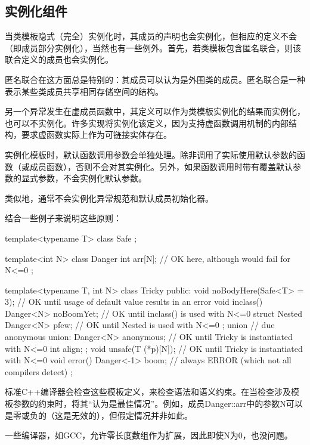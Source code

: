 \subsection{实例化组件}

当类模板隐式（完全）实例化时，其成员的声明也会实例化，但相应的定义不会（即成员部分实例化），当然也有一些例外。首先，若类模板包含匿名联合，则该联合定义的成员也会实例化。

\begin{notice}
匿名联合在这方面总是特别的：其成员可以认为是外围类的成员。匿名联合是一种表示某些类成员共享相同存储空间的结构。
\end{notice}

另一个异常发生在虚成员函数中，其定义可以作为类模板实例化的结果而实例化，也可以不实例化。许多实现将实例化该定义，因为支持虚函数调用机制的内部结构，要求虚函数实际上作为可链接实体存在。 

实例化模板时，默认函数调用参数会单独处理。除非调用了实际使用默认参数的函数（或成员函数），否则不会对其实例化。另外，如果函数调用时带有覆盖默认参数的显式参数，不会实例化默认参数。

类似地，通常不会实例化异常规范和默认成员初始化器。

结合一些例子来说明这些原则：

\begin{cpp}
template<typename T>
class Safe {};

template<int N>
class Danger {
	int arr[N]; // OK here, although would fail for N<=0
};

template<typename T, int N>
class Tricky {
	public:
	void noBodyHere(Safe<T> = 3); // OK until usage of default value results in an error
	void inclass() {
		Danger<N> noBoomYet; // OK until inclass() is used with N<=0
	}
	struct Nested {
		Danger<N> pfew; // OK until Nested is used with N<=0
	};
	union { // due anonymous union:
		Danger<N> anonymous; // OK until Tricky is instantiated with N<=0
		int align;
	};
	void unsafe(T (*p)[N]); // OK until Tricky is instantiated with N<=0
	void error() {
		Danger<-1> boom; // always ERROR (which not all compilers detect)
	}
};
\end{cpp}

标准C++编译器会检查这些模板定义，来检查语法和语义约束。在当检查涉及模板参数的约束时，将其“认为是最佳情况”。例如，成员Danger::arr中的参数N可以是零或负的（这是无效的），但假定情况并非如此。

\begin{notice}
一些编译器，如GCC，允许零长度数组作为扩展，因此即使N为0，也没问题。
\end{notice}

